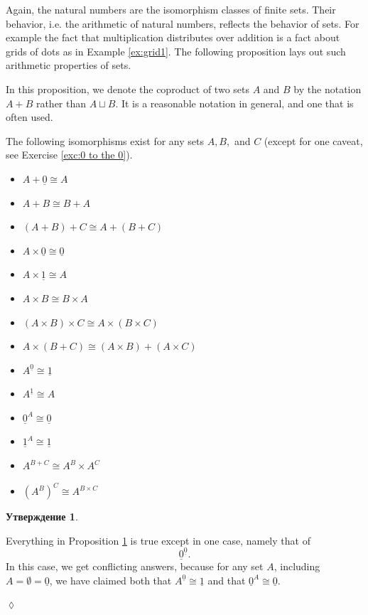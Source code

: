 \documentclass[a4paper]{book}
\def\iso{\cong}
\def\ul{\underline}
\theoremstyle{myth}
\newtheorem{propositionENG}[envENG]{\begin{english}Proposition\end{english}}
\newtheorem{excENG}[envENG]{\begin{english}Exercise\end{english}}
\newenvironment{exerciseENG}{\begin{excENG}}{\hspace*{\fill}$\lozenge$\end{excENG}}
\newtheorem{propositionRUS}[envRUS]{Утверждение}
\begin{document}
\begin{russian}
 

Again, the natural numbers are the isomorphism classes of finite sets. Their behavior, i.e. the arithmetic of natural numbers, reflects the behavior of sets. For example the fact that multiplication distributes over addition is a fact about grids of dots as in Example \ref{ex:grid1}. The following proposition lays out such arithmetic properties of sets.

 

In this proposition, we denote the coproduct of two sets $A$ and $B$ by the notation $A+B$ rather than $A\sqcup B$. It is a reasonable notation in general, and one that is often used. 

 

\begin{propositionENG}\label{prop:arithmetic of sets}
The following isomorphisms exist for any sets $A,B,$ and $C$ (except for one caveat, see Exercise \ref{exc:0 to the 0}). 
 
\begin{itemize}
\item $A+\ul{0}\iso A$
\item $A + B\iso B + A$
\item $(A + B) + C \iso A + (B + C)$
\item $A\times\ul{0}\iso\ul{0}$
\item $A\times\ul{1}\iso A$
\item $A\times B\iso B\times A$
\item $(A\times B)\times C \iso A\times (B\times C)$
\item $A\times(B+C)\iso (A\times B)+(A\times C)$
\item $A^{\ul{0}}\iso \ul{1}$
\item $A^{\ul{1}}\iso A$
\item $\ul{0}^A\iso\ul{0}$
\item $\ul{1}^A\iso\ul{1}$
\item $A^{B+C}\iso A^B\times A^C$
\item $(A^B)^C\iso A^{B\times C}$
\end{itemize}
\end{propositionENG}

\begin{propositionRUS}\label{prop:arithmetic of sets}
 
\end{propositionRUS}

\begin{exerciseENG}\label{exc:0 to the 0}
Everything in Proposition \ref{prop:arithmetic of sets} is true except in one case, namely that of $$\ul{0}^{\ul{0}}.$$ In this case, we get conflicting answers, because for any set $A$, including $A=\emptyset=\ul{0}$, we have claimed both that $A^{\ul{0}}\iso\ul{1}$ and that $\ul{0}^A\iso\ul{0}.$ 


\end{exerciseENG}
\end{russian}
\end{document}
